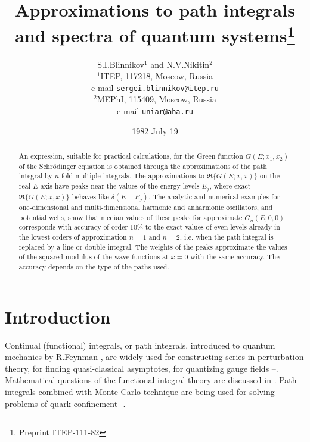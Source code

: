 \documentclass[11pt]{article}
\title{Approximations to path integrals\\
         and spectra of quantum systems\thanks{Preprint ITEP-111-82}}%
\author{S.I.Blinnikov$^1$ and N.V.Nikitin$^2$ \\
   $^1$ITEP, 117218, Moscow, Russia \\
e-mail {\tt sergei.blinnikov@itep.ru} \\
$^2$MEPhI, 115409, Moscow, Russia \\ %
e-mail {\tt uniar@aha.ru} }
\date{1982 July 19}%
\begin{document}
\begin{titlepage}
\maketitle
\thispagestyle{empty}

\begin{abstract} An expression, suitable for practical calculations, for the Green
function $G(E;x_1,x_2)$ of the Schr\"{o}dinger equation is obtained through the
approximations of the path integral by $n$-fold multiple integrals. The
approximations to $\Re\{G(E;x,x)\}$ on the real $E$-axis have peaks near the
values of the energy levels $E_{j}$, where exact $\Re\{G(E;x,x)\}$ behaves like
$\delta(E-E_j)$. The analytic and numerical examples for one-dimensional and
multi-dimensional harmonic and anharmonic oscillators, and potential wells, show
that median values of these peaks for approximate $G_n(E;0,0)$ corresponds with
accuracy of order 10\% to the exact values of even levels already in the lowest
orders of approximation $n=1$ and $n=2$, i.e. when the path integral is replaced
by a line or double integral. The weights of the peaks approximate the values of
the squared modulus of the wave functions at $x=0$ with the same accuracy. The
accuracy depends on the type of the paths used.
\end{abstract}
\end{titlepage}


\section{Introduction}

Continual (functional) integrals,  or path integrals, introduced to quantum
mechanics by R.Feyn\-man \cite{1,2}, are widely used for constructing series in
perturbation theory, for finding quasi-classical  asymptotes, for quantizing gauge
fields \cite{3}--\cite{7}. Mathematical questions of the functional integral
theory are discussed in \cite{8,9}. Path integrals combined with Monte-Carlo
technique are being used for solving problems of quark confinement
\cite{10}-\cite{12}.
\end{document}
